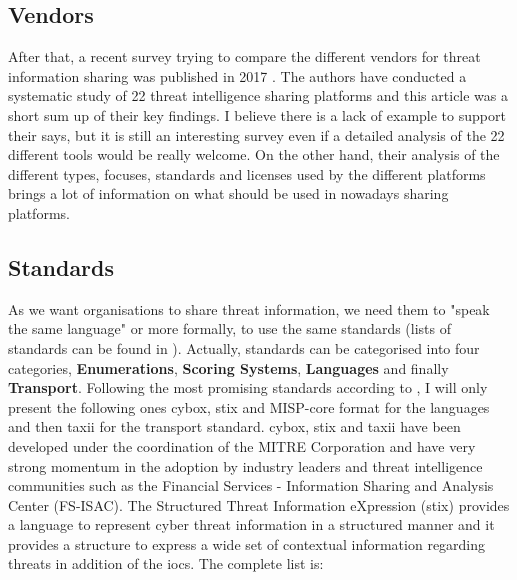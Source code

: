 \documentclass{eplmastersthesis}
\begin{document}
\subsection{Vendors}
After that, a recent survey trying to compare the different vendors for threat information sharing was published in 2017 \cite{sauerwein2017threat}. The authors have conducted a systematic study of 22 threat intelligence sharing platforms and this article was a short sum up of their key findings. I believe there is a lack of example to support their says, but it is still an interesting survey even if a detailed analysis of the 22 different tools would be really welcome.
On the other hand, their analysis of the different types, focuses, standards and licenses used by the different platforms brings a lot of information on what should be used in nowadays sharing platforms.\\

\subsection{Standards}
\label{sec:standards}
As we want organisations to share threat information, we need them to "speak the same language" or more formally, to use the same standards (lists of standards can be found in \cite{AwesomeTreat, mohaisen2017rethinking}). Actually, standards can be categorised into four categories, \textbf{Enumerations}, \textbf{Scoring Systems}, \textbf{Languages} and finally \textbf{Transport}. Following the most promising standards according to \cite{fransen2015cyber, sauerwein2017threat}, I will only present the following ones \gls{cybox}, \gls{stix} and MISP-core format for the languages and then \gls{taxii} for the transport standard.
\gls{cybox}, \gls{stix} and \gls{taxii} have been developed under the coordination of the MITRE Corporation and have very strong momentum in the adoption by industry leaders and threat intelligence communities such as the Financial Services - Information Sharing and Analysis Center (FS-ISAC).
The Structured Threat Information eXpression (\gls{stix}) \cite{barnum2012standardizing} provides a language to represent cyber threat information in a structured manner and it provides a structure to express a wide set of contextual information regarding threats in addition of the \glspl{ioc}. The complete list is:
\end{document}
